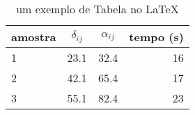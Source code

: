 \documentclass[12pt,oneside,a4paper]{article}
\begin{document}
	\begin{table}
		\centering
		\caption{um exemplo de Tabela no \LaTeX}
		\begin{tabular}{l c c r}
			\hline
			amostra & $\delta_{ij}$ & $\alpha_{ij}$ & tempo (s) \\
			\hline
			1 & 23.1 & 32.4 & 16 \\
			2 & 42.1 & 65.4 & 17 \\
			3 & 55.1 & 82.4 & 23 \\
			\hline
		\end{tabular}
	\end{table}
\end{document}
